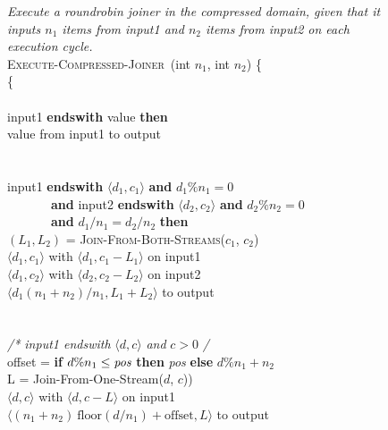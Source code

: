 \begin{figure}[t!]
\centering
\begin{minipage}{0.75\textwidth}
{\it Execute a roundrobin joiner in the compressed domain, given that
  it inputs $n_1$ items from input1 and $n_2$ items from input2 on
  each execution cycle.}\\
\textsc{Execute-Compressed-Joiner}~(int $n_1$, int $n_2$) \{\\
 \{\\
\tab{}\\
\tab{} input1 {\bf endswith} value {\bf then}\\
\tab\tab{} value from input1 to output\\
\tab\tab\\
\tab{}\\
\tab{} input1 {\bf endswith} $\langle d_1,c_1 \rangle$ {\bf and} $d_1\%n_1 = 0$\\
\tab\tab\mbox{~~~~~~~}{\bf and} input2 {\bf endswith} $\langle d_2,c_2 \rangle$ {\bf and} $d_2\%n_2 = 0$\\
\tab\tab\mbox{~~~~~~~}{\bf and} $d_1/n_1 = d_2/n_2$ {\bf then}\\
\tab\tab{} $(L_1,L_2)$ = \textsc{Join-From-Both-Streams}($c_1$, $c_2$)\\
\tab\tab{} $\langle d_1, c_1 \rangle$ with $\langle d_1, c_1-L_1\rangle$ on input1\\
\tab\tab{} $\langle d_1, c_2 \rangle$ with $\langle d_2, c_2-L_2\rangle$ on input2\\
\tab\tab{} $\langle d_1(n_1+n_2)/n_1,L_1+L_2 \rangle$ to output\\
\tab\tab\\
\tab{}\\
\tab{} {\it /* input1 endswith} $\langle d,c \rangle$ {\it and} $c>0$ {\it */}\\
\tab\tab{} offset = {\bf if} $d\%n_1 \leq \mbox{\it pos}$ {\bf then} {\it pos} {\bf else} $d\%n_1 + n_2$\\
\tab\tab{} L = {Join-From-One-Stream}($d$, $c$))\\
\tab\tab{} $\langle d, c\rangle$ with $\langle d, c - L\rangle$ on input1\\
\tab\tab{} $\langle (n_1+n_2)~\mbox{floor}(d/n_1) + \mbox{offset}, L \rangle$ to output\\

\end{minipage}
\end{figure}
